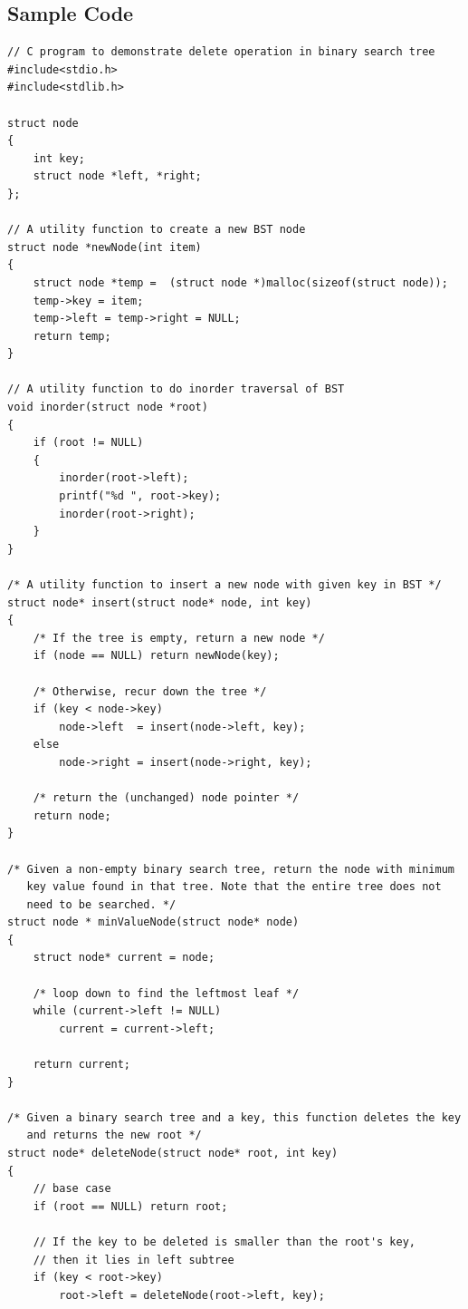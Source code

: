 \documentclass[12pt]{article}
\begin{document}
\subsection{Sample Code}

 \begin{verbatim}
// C program to demonstrate delete operation in binary search tree 
#include<stdio.h> 
#include<stdlib.h> 
  
struct node 
{ 
    int key; 
    struct node *left, *right; 
}; 
  
// A utility function to create a new BST node 
struct node *newNode(int item) 
{ 
    struct node *temp =  (struct node *)malloc(sizeof(struct node)); 
    temp->key = item; 
    temp->left = temp->right = NULL; 
    return temp; 
} 
  
// A utility function to do inorder traversal of BST 
void inorder(struct node *root) 
{ 
    if (root != NULL) 
    { 
        inorder(root->left); 
        printf("%d ", root->key); 
        inorder(root->right); 
    } 
} 
  
/* A utility function to insert a new node with given key in BST */
struct node* insert(struct node* node, int key) 
{ 
    /* If the tree is empty, return a new node */
    if (node == NULL) return newNode(key); 
  
    /* Otherwise, recur down the tree */
    if (key < node->key) 
        node->left  = insert(node->left, key); 
    else
        node->right = insert(node->right, key); 
  
    /* return the (unchanged) node pointer */
    return node; 
} 
  
/* Given a non-empty binary search tree, return the node with minimum 
   key value found in that tree. Note that the entire tree does not 
   need to be searched. */
struct node * minValueNode(struct node* node) 
{ 
    struct node* current = node; 
  
    /* loop down to find the leftmost leaf */
    while (current->left != NULL) 
        current = current->left; 
  
    return current; 
} 
  
/* Given a binary search tree and a key, this function deletes the key 
   and returns the new root */
struct node* deleteNode(struct node* root, int key) 
{ 
    // base case 
    if (root == NULL) return root; 
  
    // If the key to be deleted is smaller than the root's key, 
    // then it lies in left subtree 
    if (key < root->key) 
        root->left = deleteNode(root->left, key); 
  

\end{verbatim}
\end{document}
